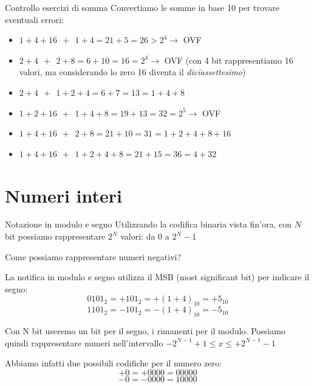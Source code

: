 \documentclass[9pt, handout]{beamer}
\begin{document}
\begin{frame}{Controllo esercizi di somma}
Convertiamo le somme in base 10 per trovare eventuali errori:

\begin{itemize}
\item $1+4+16 \ \ + \ \ 1+4 = 21+5 = 26 > 2^4 \rightarrow$ \alert{OVF}
\item $2+4 \ \ + \ \ 2+8 = 6+10 = 16 = 2^4 \rightarrow$ \alert{OVF} (con 4 bit rappresentiamo 16 valori, ma considerando lo zero 16 diventa il \emph{diciassettesimo})
\item $2+4 \ \ + \ \ 1+2+4 = 6+7 = 13 = 1+4+8$
\item $1+2+16 \ \ + \ \ 1+4+8 = 19+13 = 32 = 2^5 \rightarrow$ \alert{OVF}
\item $1+4+16 \ \ + \ \ 2+8 = 21+10 = 31 = 1+2+4+8+16$
\item $1+4+16 \ \ + \ \ 1+2+4+8 = 21+15 = 36 = 4+32$
\end{itemize}
\end{frame}

\section{Numeri interi}
\begin{frame}{Notazione in modulo e segno}
Utilizzando la codifica binaria vista fin'ora, con $N$ bit possiamo rappresentare $2^N$ valori: da 0 a $2^N - 1$

Come possiamo rappresentare numeri negativi?

\pause

La notifica in modulo e segno utilizza il \alert{MSB} (most significant bit) per indicare il segno:
\[0101_2 = +101_2 = +(1+4)_{10} = +5_{10}\]
\[1101_2 = -101_2 = -(1+4)_{10} = -5_{10}\]

\pause

Con N bit useremo un bit per il segno, i rimanenti per il modulo.
Possiamo quindi rappresentare numeri nell'intervallo $-2^{N-1}+1 \leq x \leq +2^{N-1}-1$

\pause

Abbiamo infatti due possibili codifiche per il numero zero:
\[+0 = +0000 = 00000\]
\[-0 = -0000 = 10000\]
\end{frame}
\end{document}
